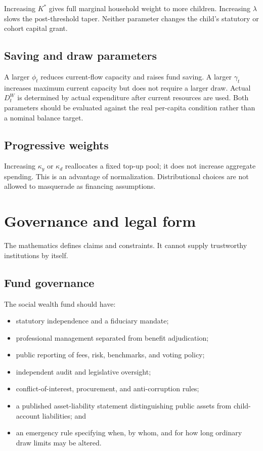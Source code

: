 \documentclass[11pt]{article}
\begin{document}
Increasing $K^*$ gives full marginal household weight to more children. Increasing
$\lambda$ slows the post-threshold taper. Neither parameter changes the child's
statutory or cohort capital grant.

\subsection{Saving and draw parameters}

A larger $\phi_t$ reduces current-flow capacity and raises fund saving. A larger
$\gamma_t$ increases maximum current capacity but does not require a larger draw.
Actual $D_t^W$ is determined by actual expenditure after current resources are used.
Both parameters should be evaluated against the real per-capita condition rather than a
nominal balance target.

\subsection{Progressive weights}

Increasing $\kappa_y$ or $\kappa_d$ reallocates a fixed top-up pool; it does not increase
aggregate spending. This is an advantage of normalization. Distributional choices are
not allowed to masquerade as financing assumptions.

\section{Governance and legal form}

The mathematics defines claims and constraints. It cannot supply trustworthy
institutions by itself.

\subsection{Fund governance}

The social wealth fund should have:

\begin{itemize}
  \item statutory independence and a fiduciary mandate;
  \item professional management separated from benefit adjudication;
  \item public reporting of fees, risk, benchmarks, and voting policy;
  \item independent audit and legislative oversight;
  \item conflict-of-interest, procurement, and anti-corruption rules;
  \item a published asset-liability statement distinguishing public assets from child-
  account liabilities; and
  \item an emergency rule specifying when, by whom, and for how long ordinary draw
  limits may be altered.
\end{itemize}
\end{document}
